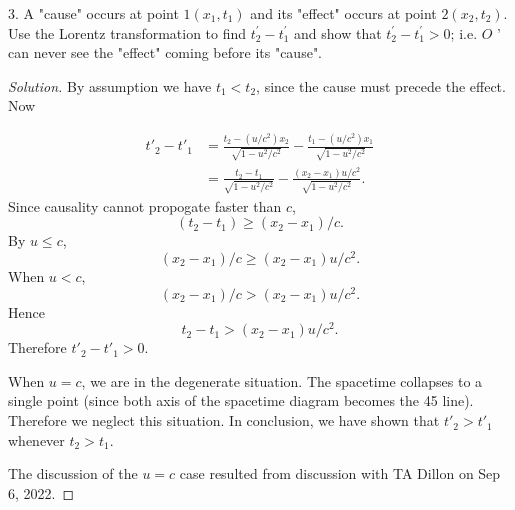 3. A "cause" occurs at point $1\left(x_1, t_1\right)$ and its "effect" occurs at point $2\left(x_2, t_2\right)$. Use the Lorentz transformation to find $t_2^{\prime}-t_1^{\prime}$ and show that $t_2^{\prime}-t_1^{\prime}>0$; i.e. $O$ ' can never see the "effect" coming before its "cause".
\begin{proof}[Solution]
	By assumption we have $t_1 < t_2$, since the cause must precede the effect. Now

	 \begin{align*}
		t'_2 - t'_1 &= 
		\frac{t_2-\left(u / c^2\right) x_2}{\sqrt{1-u^2 / c^2}} 
		- \frac{t_1-\left(u / c^2\right) x_1}{\sqrt{1-u^2 / c^2}} \\
		&= \frac{t_2 - t_1}{\sqrt{1-u^2 / c^2}} - 
		\frac{(x_2-x_1) u / c^2}{\sqrt{1-u^2 / c^2}}
	.\end{align*}
	Since causality cannot propogate faster than $c$, 
	\[
		(t_2 - t_1) \ge (x_2 - x_1) / c
	.\] 
	By $u \le c$,
	\[
		(x_2 - x_1)/c \ge  (x_2 - x_1) u / c^2
	.\] 
	When $u<c$,
	\[
		(x_2 - x_1)/c >  (x_2 - x_1) u / c^2
	.\] 
	Hence \[
		t_2 - t_1 > (x_2 - x_1) u / c^2
	.\] 
	Therefore $t'_2 - t'_1 >  0$.
	
	When $u = c$, we are in the degenerate situation. The spacetime collapses to a single point (since both axis of the spacetime diagram becomes the \SI{45}{\deg} line). Therefore we neglect this situation. In conclusion, we have shown that $t'_2 > t'_1$ whenever $t_2 > t_1$.

	The discussion of the $u = c$ case resulted from discussion with TA Dillon on Sep 6, 2022.
\end{proof}

